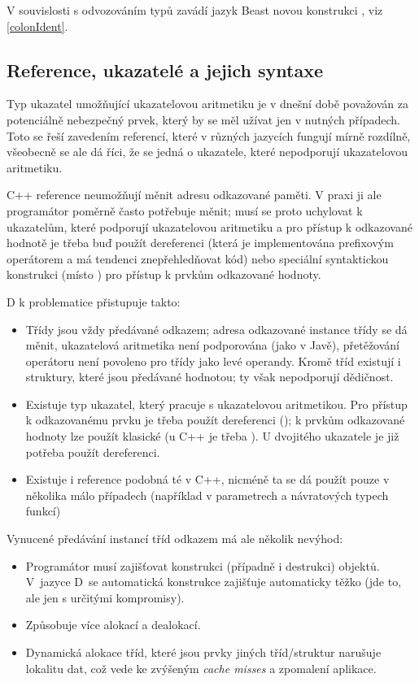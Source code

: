 V souvislosti s odvozováním typů zavádí jazyk Beast novou konstrukci , viz \autoref{colonIdent}.

\subsection{Reference, ukazatelé a jejich syntaxe} \label{pointers}
Typ ukazatel umožňující ukazatelovou aritmetiku je v dnešní době považován za potenciálně nebezpečný prvek, který by se měl užívat jen v nutných případech. Toto se řeší zavedením referencí, které v různých jazycích fungují mírně rozdílně, všeobecně se ale dá říci, že se jedná o ukazatele, které nepodporují ukazatelovou aritmetiku.

C++ reference neumožňují měnit adresu odkazované paměti. V praxi ji ale programátor poměrně často potřebuje měnit; musí se proto uchylovat k ukazatelům, které podporují ukazatelovou aritmetiku a pro přístup k odkazované hodnotě je třeba buď použít dereferenci (která je implementována prefixovým operátorem  a má tendenci znepřehledňovat kód) nebo speciální syntaktickou konstrukci (místo  ) pro přístup k prvkům odkazované hodnoty.

D k problematice přistupuje takto:
\begin{itemize}
	\item Třídy jsou vždy předávané odkazem; adresa odkazované instance třídy se dá měnit, ukazatelová aritmetika není podporována (jako v Javě), přetěžování operátoru  není povoleno pro třídy jako levé operandy. Kromě tříd existují i struktury, které jsou předávané hodnotou; ty však nepodporují dědičnost.
	\item Existuje typ ukazatel, který pracuje s ukazatelovou aritmetikou. Pro přístup k odkazovanému prvku je třeba použít dereferenci (); k prvkům odkazované hodnoty lze použít klasické  (u C++ je třeba ). U dvojitého ukazatele je již potřeba použít dereferenci.
	\item Existuje i reference podobná té v C++, nicméně ta se dá použít pouze v několika málo případech (například v parametrech a návratových typech funkcí)
\end{itemize}

Vynucené předávání instancí tříd odkazem má ale několik nevýhod:
\begin{itemize}
	\item Programátor musí zajišťovat konstrukci (případně i destrukci) objektů. V~jazyce D~se automatická konstrukce zajišťuje automaticky těžko (jde to, ale jen s určitými kompromisy).
	\item Způsobuje více alokací a dealokací.
	\item Dynamická alokace tříd, které jsou prvky jiných tříd/struktur narušuje lokalitu dat, což vede ke zvýšeným \textit{cache misses} a zpomalení aplikace.
\end{itemize}


